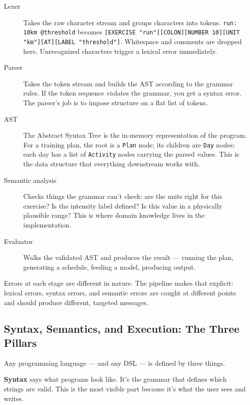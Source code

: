\begin{description}
  \item[Lexer] Takes the raw character stream and groups characters into tokens.
    \texttt{run: 10km @threshold} becomes
    \verb|[EXERCISE "run"][COLON][NUMBER 10][UNIT "km"][AT][LABEL "threshold"]|.
    Whitespace and comments are dropped here. Unrecognized characters trigger a
    lexical error immediately.

  \item[Parser] Takes the token stream and builds the AST according to the grammar rules.
    If the token sequence violates the grammar, you get a syntax error. The parser's job
    is to impose structure on a flat list of tokens.

  \item[AST] The Abstract Syntax Tree is the in-memory representation of the program.
    For a training plan, the root is a \texttt{Plan} node; its children are \texttt{Day}
    nodes; each day has a list of \texttt{Activity} nodes carrying the parsed values.
    This is the data structure that everything downstream works with.

  \item[Semantic analysis] Checks things the grammar can't check: are the units right
    for this exercise? Is the intensity label defined? Is this value in a physically
    plausible range? This is where domain knowledge lives in the implementation.

  \item[Evaluator] Walks the validated AST and produces the result --- running the plan,
    generating a schedule, feeding a model, producing output.
\end{description}

Errors at each stage are different in nature. The pipeline makes that explicit: lexical
errors, syntax errors, and semantic errors are caught at different points and should
produce different, targeted messages.

\subsection{Syntax, Semantics, and Execution: The Three Pillars}

Any programming language --- and any DSL --- is defined by three things.

\textbf{Syntax} says what programs look like. It's the grammar that defines which strings
are valid. This is the most visible part because it's what the user sees and writes.

